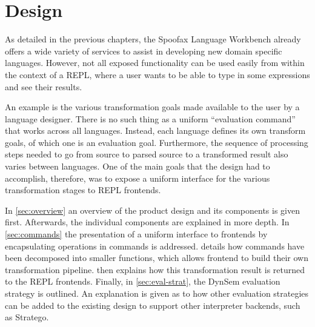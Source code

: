 \chapter{Design}
\label{cha:design}

As detailed in the previous chapters, the Spoofax Language Workbench already
offers a wide variety of services to assist in developing new domain specific
languages. However, not all exposed functionality can be used easily from within
the context of a REPL, where a user wants to be able to type in some expressions
and see their results.

An example is the various transformation goals made available to the user by a
language designer. There is no such thing as a uniform ``evaluation command''
that works across all languages. Instead, each language defines its own
transform goals, of which one is an evaluation goal.  Furthermore, the sequence
of processing steps needed to go from source to parsed source to a transformed
result also varies between languages. One of the main goals that the design had to
accomplish, therefore, was to expose a uniform interface for the various
transformation stages to REPL frontends.

In \cref{sec:overview} an overview of the product design and its
components is given first. Afterwards, the individual components are explained
in more depth. In \cref{sec:commands} the presentation of a uniform interface to
frontends by encapsulating operations in commands is addressed.
 details how commands have been decomposed into smaller
functions, which allows frontend to build their own transformation pipeline.
 then explains how this transformation result is returned to
the REPL frontends. Finally, in \cref{sec:eval-strat}, the DynSem evaluation
strategy is outlined.  An explanation is given as to how other evaluation
strategies can be added to the existing design to support other interpreter
backends, such as Stratego.











